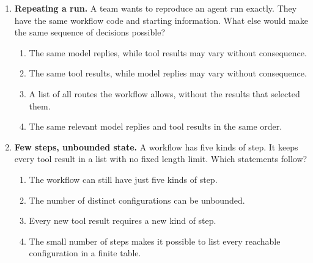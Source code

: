 \begin{enumerate}[start=1,itemsep=0.7\baselineskip]
\item\label{exercise:3} \begin{minipage}[t]{\linewidth}
\textbf{Repeating a run.} A team wants to reproduce an agent run exactly. They have the same workflow code and starting information. What else would make the same sequence of decisions possible?
\begin{enumerate}[label=\textnormal{(\Alph*)},leftmargin=*,itemsep=0pt]
\item The same model replies, while tool results may vary without consequence.
\item The same tool results, while model replies may vary without consequence.
\item A list of all routes the workflow allows, without the results that selected them.
\item The same relevant model replies and tool results in the same order.
\end{enumerate}
\end{minipage}

\item\label{exercise:4} \begin{minipage}[t]{\linewidth}
\textbf{Few steps, unbounded state.} A workflow has five kinds of step. It keeps every tool result in a list with no fixed length limit. Which statements follow?
\begin{enumerate}[label=\textnormal{(\Alph*)},leftmargin=*,itemsep=0pt]
\item The workflow can still have just five kinds of step.
\item The number of distinct configurations can be unbounded.
\item Every new tool result requires a new kind of step.
\item The small number of steps makes it possible to list every reachable configuration in a finite table.
\end{enumerate}
\end{minipage}


\end{enumerate}
